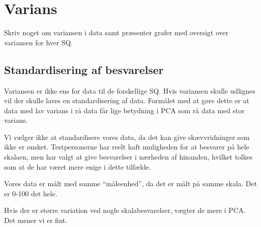 \section{Varians}
\label{TestAfSkalaVarians}
%
Skriv noget om variansen i data samt præsenter grafer med oversigt over variansen for hver SQ. 
%
\subsection{Standardisering af besvarelser}
Variansen er ikke ens for data til de forskellige SQ. Hvis variansen skulle udlignes vil der skulle laves en standardisering af data. Formålet med at gøre dette er at data med lav varians i rå data får lige betydning i PCA som rå data med stor varians. 

Vi vælger ikke at standardisere vores data, da det kan give skævvridninger som ikke er ønsket. Testpersonerne har reelt haft muligheden for at besvarer på hele skalaen, men har valgt at give besvarelser i nærheden af hinanden, hvilket tolkes som at de har været mere enige i dette tilfælde. 

Vores data er målt med samme ``måleenhed'', da det er målt på samme skala. Det er 0-100 det hele. 

Hvis der er større variation ved nogle skalabesvarelser, vægter de mere i PCA. Det mener vi er fint. 
